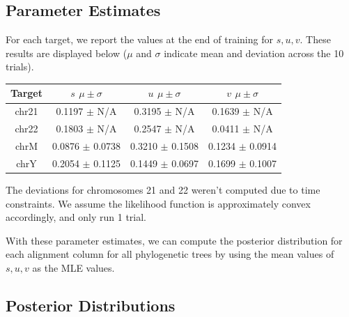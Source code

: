\documentclass[12pt]{article}
\begin{document}
        \subsection{Parameter Estimates}
        For each target, we report the values at the end of training for $s, u, v$. These results are displayed below ($\mu$ and $\sigma$ indicate mean and deviation across the 10 trials).
        \begin{center}
        \begin{tabular}{ |c|c|c|c| } \hline
        Target & $s$ $\mu \pm \sigma$ & $u$ $\mu \pm \sigma$ & $v$ $\mu \pm \sigma$ \\ \hline
        chr21 & 0.1197 $\pm$ N/A & 0.3195 $\pm$ N/A & 0.1639 $\pm$ N/A \\ \hline
        chr22 & 0.1803 $\pm$ N/A & 0.2547 $\pm$ N/A & 0.0411 $\pm$ N/A \\ \hline
        chrM & 0.0876 $\pm$ 0.0738 & 0.3210 $\pm$ 0.1508 & 0.1234 $\pm$ 0.0914 \\ \hline
        chrY & 0.2054 $\pm$ 0.1125 & 0.1449 $\pm$ 0.0697 & 0.1699 $\pm$ 0.1007 \\ \hline
        \end{tabular}
        \end{center}
        The deviations for chromosomes 21 and 22 weren't computed due to time constraints. We assume the likelihood function is approximately convex accordingly, and only run 1 trial.
        
        With these parameter estimates, we can compute the posterior distribution for each alignment column for all phylogenetic trees by using the mean values of $s, u, v$ as the MLE values.
        \subsection{Posterior Distributions}
\end{document}
